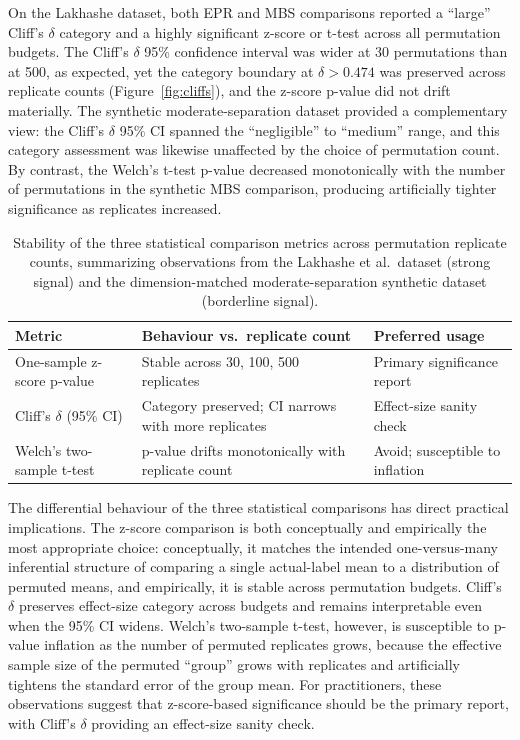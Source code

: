 \documentclass[11pt]{article}
\begin{document}
On the Lakhashe dataset, both EPR and MBS comparisons reported a ``large'' Cliff's $\delta$ category and a highly significant z-score or t-test across all permutation budgets. The Cliff's $\delta$ 95\% confidence interval was wider at 30 permutations than at 500, as expected, yet the category boundary at $\delta > 0.474$ was preserved across replicate counts (Figure~\ref{fig:cliffs}), and the z-score p-value did not drift materially. The synthetic moderate-separation dataset provided a complementary view: the Cliff's $\delta$ 95\% CI spanned the ``negligible'' to ``medium'' range, and this category assessment was likewise unaffected by the choice of permutation count. By contrast, the Welch's t-test p-value decreased monotonically with the number of permutations in the synthetic MBS comparison, producing artificially tighter significance as replicates increased.

\begin{table}[htbp]
\centering
\caption{Stability of the three statistical comparison metrics across permutation replicate counts, summarizing observations from the Lakhashe et al.\ dataset (strong signal) and the dimension-matched moderate-separation synthetic dataset (borderline signal).}
\label{tab:perm_stability}
\begin{tabular}{lll}
\toprule
Metric & Behaviour vs.\ replicate count & Preferred usage \\
\midrule
One-sample z-score p-value     & Stable across 30, 100, 500 replicates   & Primary significance report \\
Cliff's $\delta$ (95\% CI)      & Category preserved; CI narrows with more replicates & Effect-size sanity check \\
Welch's two-sample t-test      & p-value drifts monotonically with replicate count & Avoid; susceptible to inflation \\
\bottomrule
\end{tabular}
\end{table}

The differential behaviour of the three statistical comparisons has direct practical implications. The z-score comparison is both conceptually and empirically the most appropriate choice: conceptually, it matches the intended one-versus-many inferential structure of comparing a single actual-label mean to a distribution of permuted means, and empirically, it is stable across permutation budgets. Cliff's $\delta$ preserves effect-size category across budgets and remains interpretable even when the 95\% CI widens. Welch's two-sample t-test, however, is susceptible to p-value inflation as the number of permuted replicates grows, because the effective sample size of the permuted ``group'' grows with replicates and artificially tightens the standard error of the group mean. For practitioners, these observations suggest that z-score-based significance should be the primary report, with Cliff's $\delta$ providing an effect-size sanity check.
\end{document}
